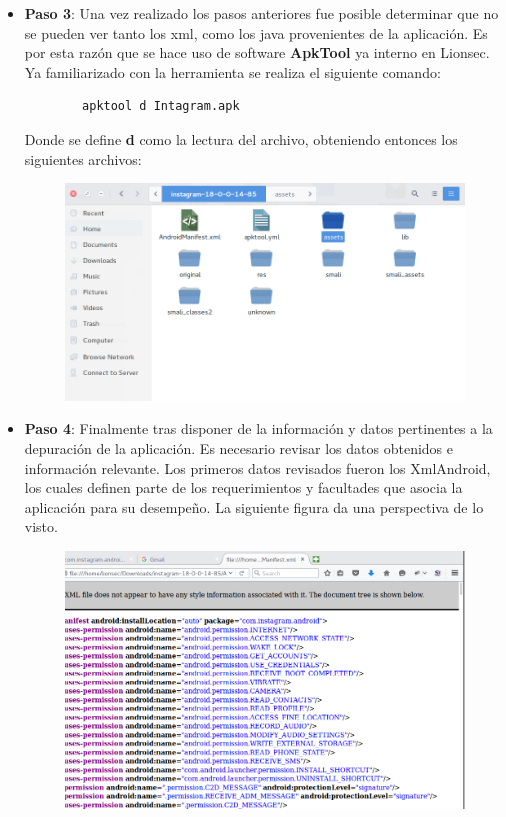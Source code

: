 \documentclass[a4paper,11pt]{article}
\theoremstyle{mytheor}
\begin{document}
\begin{itemize}
    
    \item \textbf{Paso 3}: Una vez realizado los pasos anteriores fue posible determinar que no se pueden ver tanto los xml, como los java provenientes de la aplicación. Es por esta razón que se hace uso de software \textbf{ApkTool} ya interno en Lionsec.
    Ya familiarizado con la herramienta se realiza el siguiente comando:
    
    \begin{verbatim}
        apktool d Intagram.apk
    \end{verbatim}  
    
    Donde se define \textbf{d} como la lectura del archivo, obteniendo entonces los siguientes archivos:
    
       \begin{figure}[!h]
    \centering
    \includegraphics[scale=0.5]{apktool.png}
    \label{fig:my_label}
    \end{figure}
    
    
    
    \item \textbf{Paso 4}: Finalmente tras disponer de la información y datos pertinentes a la depuración de la aplicación. Es necesario revisar los datos obtenidos e información relevante.
    Los primeros datos revisados fueron los XmlAndroid, los cuales definen  parte de los requerimientos y facultades que asocia la aplicación para su desempeño. La siguiente figura da una perspectiva de lo visto.
    
     \begin{figure}[!h]
    \centering
    \includegraphics[scale=0.5]{xml.png}
    \label{fig:my_label}
    \end{figure}
    

\end{itemize}
\end{document}
